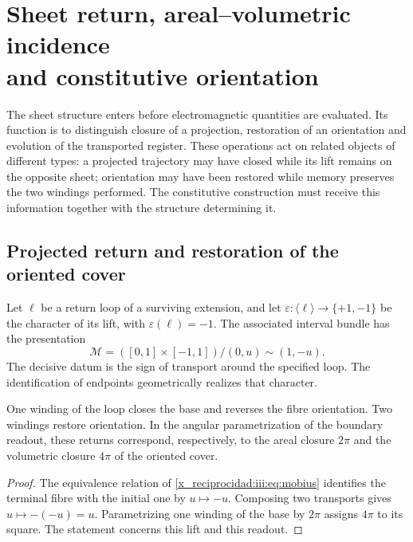 

\chapter[Sheet return, areal--volumetric incidence and constitutive orientation]{Sheet return, areal--volumetric incidence\\and constitutive orientation}
\label{x_reciprocidad:iii:sec:hojas}
\label{x_reciprocidad:nuclear:constitutiva-antecedente}

The sheet structure enters before electromagnetic quantities
are evaluated. Its function is to distinguish closure of a projection,
restoration of an orientation and evolution of the transported register.
These operations act on related objects of different types: a
projected trajectory may have closed while its lift remains
on the opposite sheet; orientation may have been restored while memory
preserves the two windings performed. The constitutive construction must receive
this information together with the structure determining it.

\section{Projected return and restoration of the oriented cover}

Let $\ell$ be a return loop of a surviving extension, and let
$\varepsilon:\langle\ell\rangle\to\{+1,-1\}$ be the character of its
lift, with $\varepsilon(\ell)=-1$. The associated interval bundle
has the presentation
\begin{equation}
 \mathcal M=([0,1]\times[-1,1])/{(0,u)\sim(1,-u)}.
 \label{x_reciprocidad:iii:eq:mobius}
\end{equation}
The decisive datum is the sign of transport around the specified loop. The
identification of endpoints geometrically realizes that character.

\begin{proposition}
One winding of the loop closes the base and reverses the fibre orientation. Two
windings restore orientation. In the angular parametrization of the boundary
readout, these returns correspond, respectively, to the areal closure $2\pi$ and
the volumetric closure $4\pi$ of the oriented cover.
\end{proposition}
\begin{proof}
The equivalence relation of \eqref{x_reciprocidad:iii:eq:mobius} identifies the terminal fibre
with the initial one by $u\mapsto-u$. Composing two transports gives
$u\mapsto-(-u)=u$. Parametrizing one winding of the base by $2\pi$ assigns $4\pi$
to its square. The statement concerns this lift and this readout.
\end{proof}

